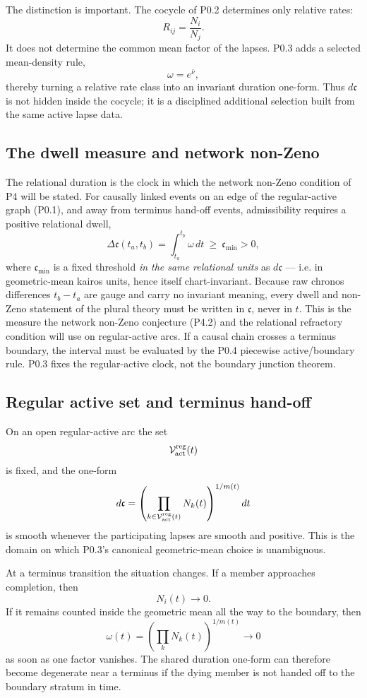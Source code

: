 \documentclass[11pt,a4paper]{article}
\theoremstyle{definition}
\theoremstyle{plain}
\theoremstyle{remark}
\begin{document}
The distinction is important. The cocycle of P0.2 determines only relative
rates:
\[
R_{ij}=\frac{N_i}{N_j}.
\]
It does not determine the common mean factor of the lapses. P0.3 adds a selected
mean-density rule,
\[
\omega=e^{\bar\nu},
\]
thereby turning a relative rate class into an invariant duration one-form. Thus
\(d\mathfrak c\) is not hidden inside the cocycle; it is a disciplined additional
selection built from the same active lapse data.

\subsection{The dwell measure and network non-Zeno}

The relational duration is the clock in which the network non-Zeno condition of P4
will be stated. For causally linked events on an edge of the regular-active graph
(P0.1), and away from terminus hand-off events, admissibility requires a positive
relational dwell,
\[
\Delta\mathfrak c(t_a,t_b)=\int_{t_a}^{t_b}\omega\,dt\ \geq\ \mathfrak c_{\min}>0 ,
\]
where \(\mathfrak c_{\min}\) is a fixed threshold \emph{in the same relational units}
as \(d\mathfrak c\) --- i.e. in geometric-mean kairos units, hence itself
chart-invariant. Because raw chronos differences \(t_b-t_a\) are gauge and carry no
invariant meaning, every dwell and non-Zeno statement of the plural theory must be
written in \(\mathfrak c\), never in \(t\). This is the measure the network non-Zeno
conjecture (P4.2) and the relational refractory condition will use on regular-active
arcs. If a causal chain crosses a terminus boundary, the interval must be evaluated
by the P0.4 piecewise active/boundary rule. P0.3 fixes the regular-active clock, not
the boundary junction theorem.

\subsection{Regular active set and terminus hand-off}

On an open regular-active arc the set
\[
\mathcal V_{\rm act}^{\rm reg}(t)
\]
is fixed, and the one-form
\[
d\mathfrak c
=
\left(
\prod_{k\in\mathcal V_{\rm act}^{\rm reg}(t)}
N_k(t)
\right)^{1/m(t)}dt
\]
is smooth whenever the participating lapses are smooth and positive. This is the
domain on which P0.3's canonical geometric-mean choice is unambiguous.

At a terminus transition the situation changes. If a member approaches completion,
then
\[
N_i(t)\to0.
\]
If it remains counted inside the geometric mean all the way to the boundary, then
\[
\omega(t)
=
\left(
\prod_k N_k(t)
\right)^{1/m(t)}
\to0
\]
as soon as one factor vanishes. The shared duration one-form can therefore become
degenerate near a terminus if the dying member is not handed off to the boundary
stratum in time.
\end{document}
